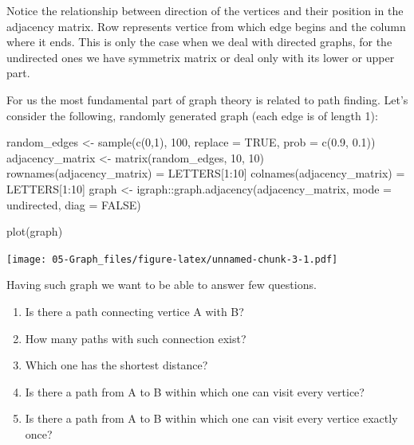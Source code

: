 \documentclass[
]{book}
\newenvironment{Shaded}{\begin{snugshade}}{\end{snugshade}}
\newcommand{\AttributeTok}[1]{\textcolor[rgb]{0.77,0.63,0.00}{#1}}
\newcommand{\ConstantTok}[1]{\textcolor[rgb]{0.00,0.00,0.00}{#1}}
\newcommand{\DecValTok}[1]{\textcolor[rgb]{0.00,0.00,0.81}{#1}}
\newcommand{\FloatTok}[1]{\textcolor[rgb]{0.00,0.00,0.81}{#1}}
\newcommand{\FunctionTok}[1]{\textcolor[rgb]{0.00,0.00,0.00}{#1}}
\newcommand{\NormalTok}[1]{#1}
\newcommand{\OtherTok}[1]{\textcolor[rgb]{0.56,0.35,0.01}{#1}}
\newcommand{\SpecialCharTok}[1]{\textcolor[rgb]{0.00,0.00,0.00}{#1}}
\newcommand{\StringTok}[1]{\textcolor[rgb]{0.31,0.60,0.02}{#1}}
\providecommand{\tightlist}{%
  \setlength{\itemsep}{0pt}\setlength{\parskip}{0pt}}
\begin{document}
Notice the relationship between direction of the vertices and their position in the adjacency matrix. Row represents vertice from which edge begins and the column where it ends. This is only the case when we deal with directed graphs, for the undirected ones we have symmetrix matrix or deal only with its lower or upper part.

For us the most fundamental part of graph theory is related to path finding. Let's consider the following, randomly generated graph (each edge is of length 1):

\begin{Shaded}
\begin{Highlighting}[]
\NormalTok{random\_edges }\OtherTok{\textless{}{-}} \FunctionTok{sample}\NormalTok{(}\FunctionTok{c}\NormalTok{(}\DecValTok{0}\NormalTok{,}\DecValTok{1}\NormalTok{), }\DecValTok{100}\NormalTok{, }\AttributeTok{replace =} \ConstantTok{TRUE}\NormalTok{, }\AttributeTok{prob =} \FunctionTok{c}\NormalTok{(}\FloatTok{0.9}\NormalTok{, }\FloatTok{0.1}\NormalTok{))}
\NormalTok{adjacency\_matrix }\OtherTok{\textless{}{-}} \FunctionTok{matrix}\NormalTok{(random\_edges, }\DecValTok{10}\NormalTok{, }\DecValTok{10}\NormalTok{)}
\FunctionTok{rownames}\NormalTok{(adjacency\_matrix) }\OtherTok{=}\NormalTok{ LETTERS[}\DecValTok{1}\SpecialCharTok{:}\DecValTok{10}\NormalTok{]}
\FunctionTok{colnames}\NormalTok{(adjacency\_matrix) }\OtherTok{=}\NormalTok{ LETTERS[}\DecValTok{1}\SpecialCharTok{:}\DecValTok{10}\NormalTok{]}
\NormalTok{graph }\OtherTok{\textless{}{-}}\NormalTok{ igraph}\SpecialCharTok{::}\FunctionTok{graph.adjacency}\NormalTok{(adjacency\_matrix, }\AttributeTok{mode =} \StringTok{\textquotesingle{}undirected\textquotesingle{}}\NormalTok{, }
                                 \AttributeTok{diag =} \ConstantTok{FALSE}\NormalTok{)}

\FunctionTok{plot}\NormalTok{(graph)}
\end{Highlighting}
\end{Shaded}

\texttt{[image: 05-Graph\_files/figure-latex/unnamed-chunk-3-1.pdf]}

Having such graph we want to be able to answer few questions.

\begin{enumerate}
\def\labelenumi{\arabic{enumi}.}
\tightlist
\item
  Is there a path connecting vertice A with B?
\item
  How many paths with such connection exist?
\item
  Which one has the shortest distance?
\item
  Is there a path from A to B within which one can visit every vertice?
\item
  Is there a path from A to B within which one can visit every vertice exactly once?
\end{enumerate}
\end{document}
